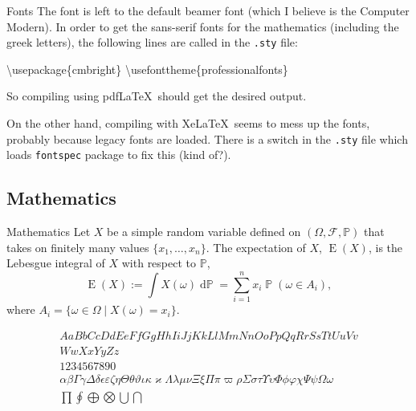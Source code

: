 \documentclass[,aspectratio=43]{beamer}
\newenvironment{Shaded}{\begin{snugshade}}{\end{snugshade}}
\newcommand{\BuiltInTok}[1]{#1}
\newcommand{\ExtensionTok}[1]{#1}
\newcommand{\FunctionTok}[1]{\textcolor[rgb]{0.00,0.00,0.00}{#1}}
\newcommand{\NormalTok}[1]{#1}
\begin{document}
\begin{frame}[fragile]{Fonts}
\protect\hypertarget{fonts}{}
The font is left to the default beamer font (which I believe is the
Computer Modern). In order to get the sans-serif fonts for the
mathematics (including the greek letters), the following lines are
called in the \texttt{.sty} file:

\begin{Shaded}
\begin{Highlighting}[]
\BuiltInTok{\textbackslash{}usepackage}\NormalTok{\{}\ExtensionTok{cmbright}\NormalTok{\}}
\FunctionTok{\textbackslash{}usefonttheme}\NormalTok{\{professionalfonts\}}
\end{Highlighting}
\end{Shaded}

So compiling using pdf\LaTeX~should get the desired output. \medskip

On the other hand, compiling with Xe\LaTeX~seems to mess up the fonts,
probably because legacy fonts are loaded. There is a switch in the
\texttt{.sty} file which loads \texttt{fontspec} package to fix this
(kind of?).
\end{frame}

\hypertarget{mathematics}{%
\subsection{Mathematics}\label{mathematics}}

\begin{frame}{Mathematics}
Let \(X\) be a simple random variable defined on
\((\Omega,\mathcal F,\mathbb P)\) that takes on finitely many values
\(\{x_1,\dots,x_n\}\). The expectation of \(X\),
\(\operatorname{E}(X)\), is the Lebesgue integral of \(X\) with respect
to \(\mathbb P\), \[
\operatorname{E}(X) := \int X(\omega) \operatorname{d \mathbb P} = \sum_{i=1}^n x_i \operatorname{\mathbb P}(\omega \in A_i),
\] where \(A_i=\{\omega\in\Omega \mid X(\omega)=x_i \}\).

\vspace{-0.5em}

\begin{gather*}
AaBbCcDdEeFfGgHhIiJjKkLlMmNnOoPpQqRrSsTtUuVv\\WwXxYyZz \\[0.5em]
1234567890 \\[0.5em]
\alpha
 \beta
\Gamma  \gamma
\Delta  \delta
\epsilon  \varepsilon   
\zeta
\eta
\Theta \theta  \vartheta
\iota
\kappa  \varkappa
\Lambda  \lambda
\mu
\nu
\Xi  \xi
\Pi \pi  \varpi
\rho  
\Sigma \sigma 
\tau
\Upsilon  \upsilon
\Phi \phi  \varphi
\chi
\Psi  \psi
\Omega  \omega \\[0.5em]
\prod \oint \bigoplus \bigotimes \bigcup \bigcap 
\end{gather*}
\end{frame}
\end{document}

